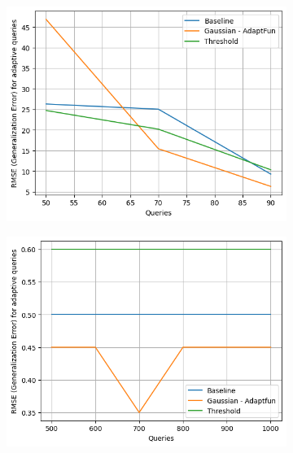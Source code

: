 {\small
\begin{figure}
\centering
\begin{subfigure}{.32\textwidth}
\begin{centering}
\includegraphics[width=1.0\textwidth]{n_adaptivity.png}
\caption{}
\end{centering}
\end{subfigure}
\quad
\begin{subfigure}{.3\textwidth}
\begin{centering}
\includegraphics[width=1.0\textwidth]{nm_adaptivity.png}
\caption{}
\end{centering}
\end{subfigure}
\begin{subfigure}{.32\textwidth}

\end{subfigure}
\end{figure}}
